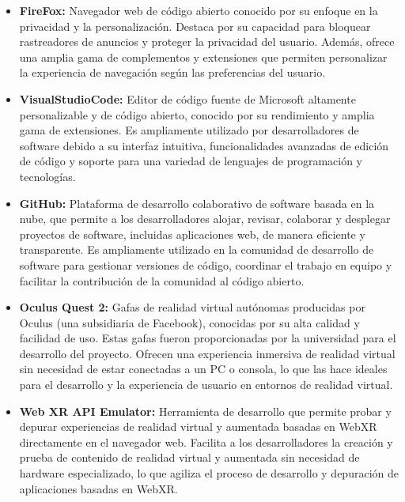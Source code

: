 \documentclass[a4paper, 12pt]{book}
\begin{document}
\begin{itemize}
  \item \textbf{FireFox:} Navegador web de código abierto conocido por su enfoque en la privacidad y la personalización. Destaca por su capacidad 
  para bloquear rastreadores de anuncios y proteger la privacidad del usuario. Además, ofrece una amplia gama de complementos y extensiones que permiten 
  personalizar la experiencia de navegación según las preferencias del usuario.
  
  \item \textbf{VisualStudioCode:} Editor de código fuente de Microsoft altamente personalizable y de código abierto, conocido por su rendimiento y amplia gama 
  de extensiones. Es ampliamente utilizado por desarrolladores de software debido a su interfaz intuitiva, funcionalidades avanzadas de edición de código y soporte 
  para una variedad de lenguajes de programación y tecnologías.
  
  \item \textbf{GitHub:} Plataforma de desarrollo colaborativo de software basada en la nube, que permite a los desarrolladores alojar, revisar, colaborar y desplegar 
  proyectos de software, incluidas aplicaciones web, de manera eficiente y transparente. Es ampliamente utilizado en la comunidad de desarrollo de software para gestionar 
  versiones de código, coordinar el trabajo en equipo y facilitar la contribución de la comunidad al código abierto.
  
  \item \textbf{Oculus Quest 2:} Gafas de realidad virtual autónomas producidas por Oculus (una subsidiaria de Facebook), conocidas por su alta calidad y facilidad de uso. 
  Estas gafas fueron proporcionadas por la universidad para el desarrollo del proyecto. Ofrecen una experiencia inmersiva de realidad virtual sin necesidad de estar 
  conectadas a un PC o consola, lo que las hace ideales para el desarrollo y la experiencia de usuario en entornos de realidad virtual.
  
  \item \textbf{Web XR API Emulator:} Herramienta de desarrollo que permite probar y depurar experiencias de realidad virtual y aumentada basadas en WebXR directamente 
  en el navegador web. Facilita a los desarrolladores la creación y prueba de contenido de realidad virtual y aumentada sin necesidad de hardware especializado, lo que 
  agiliza el proceso de desarrollo y depuración de aplicaciones basadas en WebXR.
  
\end{itemize}
\end{document}
